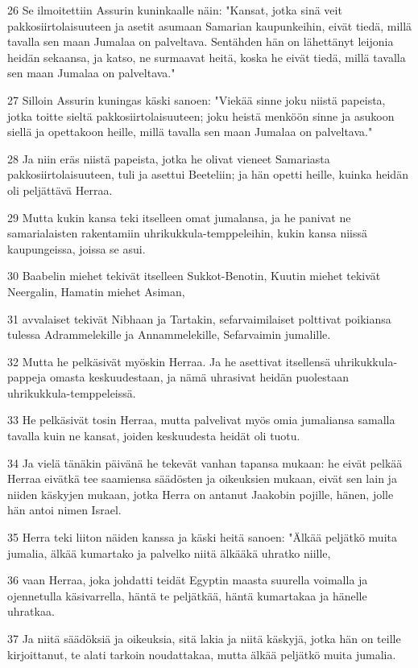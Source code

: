 \par 26 Se ilmoitettiin Assurin kuninkaalle näin: "Kansat, jotka sinä veit pakkosiirtolaisuuteen ja asetit asumaan Samarian kaupunkeihin, eivät tiedä, millä tavalla sen maan Jumalaa on palveltava. Sentähden hän on lähettänyt leijonia heidän sekaansa, ja katso, ne surmaavat heitä, koska he eivät tiedä, millä tavalla sen maan Jumalaa on palveltava."
\par 27 Silloin Assurin kuningas käski sanoen: "Viekää sinne joku niistä papeista, jotka toitte sieltä pakkosiirtolaisuuteen; joku heistä menköön sinne ja asukoon siellä ja opettakoon heille, millä tavalla sen maan Jumalaa on palveltava."
\par 28 Ja niin eräs niistä papeista, jotka he olivat vieneet Samariasta pakkosiirtolaisuuteen, tuli ja asettui Beeteliin; ja hän opetti heille, kuinka heidän oli peljättävä Herraa.
\par 29 Mutta kukin kansa teki itselleen omat jumalansa, ja he panivat ne samarialaisten rakentamiin uhrikukkula-temppeleihin, kukin kansa niissä kaupungeissa, joissa se asui.
\par 30 Baabelin miehet tekivät itselleen Sukkot-Benotin, Kuutin miehet tekivät Neergalin, Hamatin miehet Asiman,
\par 31 avvalaiset tekivät Nibhaan ja Tartakin, sefarvaimilaiset polttivat poikiansa tulessa Adrammelekille ja Annammelekille, Sefarvaimin jumalille.
\par 32 Mutta he pelkäsivät myöskin Herraa. Ja he asettivat itsellensä uhrikukkula-pappeja omasta keskuudestaan, ja nämä uhrasivat heidän puolestaan uhrikukkula-temppeleissä.
\par 33 He pelkäsivät tosin Herraa, mutta palvelivat myös omia jumaliansa samalla tavalla kuin ne kansat, joiden keskuudesta heidät oli tuotu.
\par 34 Ja vielä tänäkin päivänä he tekevät vanhan tapansa mukaan: he eivät pelkää Herraa eivätkä tee saamiensa säädösten ja oikeuksien mukaan, eivät sen lain ja niiden käskyjen mukaan, jotka Herra on antanut Jaakobin pojille, hänen, jolle hän antoi nimen Israel.
\par 35 Herra teki liiton näiden kanssa ja käski heitä sanoen: "Älkää peljätkö muita jumalia, älkää kumartako ja palvelko niitä älkääkä uhratko niille,
\par 36 vaan Herraa, joka johdatti teidät Egyptin maasta suurella voimalla ja ojennetulla käsivarrella, häntä te peljätkää, häntä kumartakaa ja hänelle uhratkaa.
\par 37 Ja niitä säädöksiä ja oikeuksia, sitä lakia ja niitä käskyjä, jotka hän on teille kirjoittanut, te alati tarkoin noudattakaa, mutta älkää peljätkö muita jumalia.
